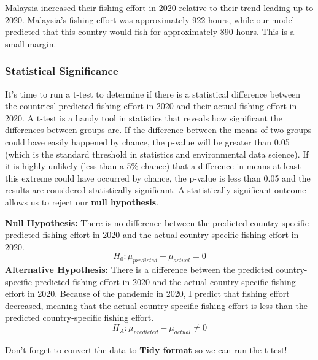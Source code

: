 \documentclass[
]{article}
\begin{document}
Malaysia increased their fishing effort in 2020 relative to their trend
leading up to 2020. Malaysia's fishing effort was approximately 922
hours, while our model predicted that this country would fish for
approximately 890 hours. This is a small margin.

\hypertarget{statistical-significance}{%
\subsubsection{Statistical
Significance}\label{statistical-significance}}

It's time to run a t-test to determine if there is a statistical
difference between the countries' predicted fishing effort in 2020 and
their actual fishing effort in 2020. A t-test is a handy tool in
statistics that reveals how significant the differences between groups
are. If the difference between the means of two groups could have easily
happened by chance, the p-value will be greater than 0.05 (which is the
standard threshold in statistics and environmental data science). If it
is highly unlikely (less than a 5\% chance) that a difference in means
at least this extreme could have occurred by chance, the p-value is less
than 0.05 and the results are considered statistically significant. A
statistically significant outcome allows us to reject our \textbf{null
hypothesis}.

\textbf{Null Hypothesis:} There is no difference between the predicted
country-specific predicted fishing effort in 2020 and the actual
country-specific fishing effort in 2020.
\[H_{0}: \mu_{predicted} - \mu_{actual} = 0\] \textbf{Alternative
Hypothesis:} There is a difference between the predicted
country-specific predicted fishing effort in 2020 and the actual
country-specific fishing effort in 2020. Because of the pandemic in
2020, I predict that fishing effort decreased, meaning that the actual
country-specific fishing effort is less than the predicted
country-specific fishing effort.
\[H_{A}: \mu_{predicted} - \mu_{actual} \neq 0\]

Don't forget to convert the data to \textbf{Tidy format} so we can run
the t-test!
\end{document}
